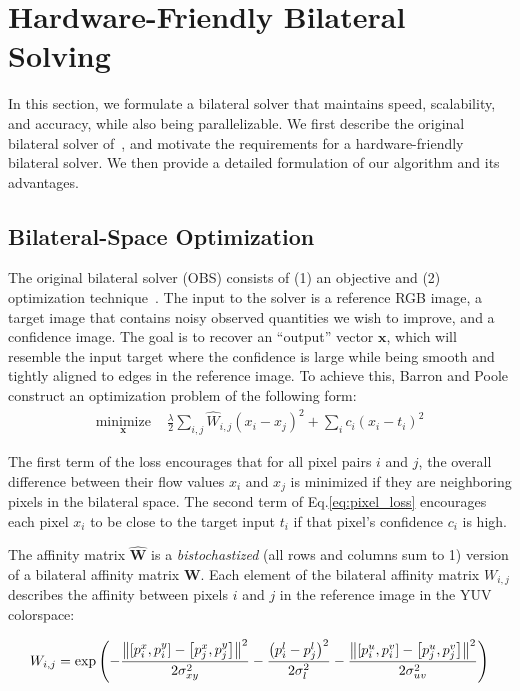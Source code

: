 \section{Hardware-Friendly Bilateral Solving}
\label{sec:solver}

In this section, we formulate a bilateral solver that maintains speed, scalability, and accuracy, while also being parallelizable.
We first describe the original bilateral solver of~\cite{BarronPoole2016}, and motivate the requirements for a hardware-friendly bilateral solver. We then provide a detailed formulation of our algorithm and its advantages.

\subsection{Bilateral-Space Optimization}
The original bilateral solver (OBS) consists of (1) an objective and (2) optimization technique~\cite{BarronPoole2016}.
The input to the solver is a reference RGB image, a target image that contains noisy observed quantities we wish to improve, and a confidence image.
The goal is to recover an ``output'' vector $\mathbf{x}$, which will resemble the input target where the confidence is large while being smooth and tightly aligned to edges in the reference image.
To achieve this, Barron and Poole construct an optimization problem of the following form:
\begin{align}
  \underset{\mathbf{x}}{\mathrm{minimize}} &\,\, \frac{\lambda}{2} \sum_{i, j} \hat W_{i,j} \left(x_i - x_j \right)^2  + \sum_i c_i (x_i - t_i)^2
\label{eq:pixel_loss}
\end{align}

The first term of the loss encourages that for all pixel pairs $i$ and $j$, the overall difference between their flow values $x_i$ and $x_j$ is minimized if they are neighboring pixels in the bilateral space.
The second term of Eq.\ref{eq:pixel_loss} encourages each pixel $x_i$ to be close to the target input $t_i$ if that pixel's confidence $c_i$ is high.

The affinity matrix $\mathbf{\hat W}$ is a \emph{bistochastized} (all rows and columns sum to 1) version of a bilateral affinity matrix $\mathbf{W}$.
Each element of the bilateral affinity matrix $W_{i, j}$ describes the affinity between pixels $i$ and $j$ in the reference image in the YUV colorspace:

\begin{align}
W_{i,j} = \exp\left( - { \frac{ \norm*{ \left[ p^x_i, p^y_i \right] - \left[ p^x_j, p^y_j \right] }^2 } { 2 \sigma_{xy}^2 } } -  { \frac{ \left( p^l_i - p^l_j \right)^2 }{ 2 \sigma_{l}^2 } } -  { \frac{\norm*{ \left[ p^u_i, p^v_i \right] - \left[p^u_j, p^v_j \right] }^2 }{ 2 \sigma_{uv}^2 }} \right)
\label{eq:bilateral_affinity}
\end{align}


